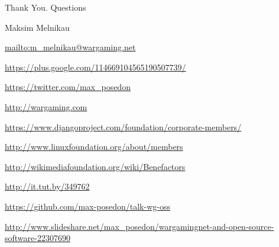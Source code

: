 \documentclass[aspectratio=169]{beamer}
\begin{document}
{


\begin{frame}{Thank You. Questions}
    \begin{block}{Maksim Melnikau}
    \par \url{mailto:m\_melnikau@wargaming.net}
    \par \url{https://plus.google.com/114669104565190507739/}
    \par \url{https://twitter.com/max\_posedon}
    \par \url{http://wargaming.com}
    \par \url{https://www.djangoproject.com/foundation/corporate-members/}
    \par \url{http://www.linuxfoundation.org/about/members}
    \par \url{http://wikimediafoundation.org/wiki/Benefactors}
    \par \url{http://it.tut.by/349762}
    \par \url{https://github.com/max-posedon/talk-wg-oss}
    \par \url{http://www.slideshare.net/max\_posedon/wargamingnet-and-open-source-software-22307690}
    \end{block}
\end{frame}
}
\end{document}
